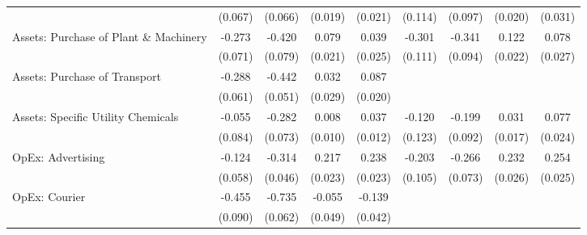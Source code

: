 {\begin{longtable}{l*{8}{c}}
                    &     (0.067)         &     (0.066)         &     (0.019)         &     (0.021)         &     (0.114)         &     (0.097)         &     (0.020)         &     (0.031)         \\
Assets: Purchase of Plant \& Machinery&      -0.273\sym{***}&      -0.420\sym{***}&       0.079\sym{***}&       0.039         &      -0.301\sym{**} &      -0.341\sym{***}&       0.122\sym{***}&       0.078\sym{**} \\
                    &     (0.071)         &     (0.079)         &     (0.021)         &     (0.025)         &     (0.111)         &     (0.094)         &     (0.022)         &     (0.027)         \\
Assets: Purchase of Transport&      -0.288\sym{***}&      -0.442\sym{***}&       0.032         &       0.087\sym{***}&                     &                     &                     &                     \\
                    &     (0.061)         &     (0.051)         &     (0.029)         &     (0.020)         &                     &                     &                     &                     \\
Assets: Specific Utility Chemicals&      -0.055         &      -0.282\sym{***}&       0.008         &       0.037\sym{**} &      -0.120         &      -0.199\sym{*}  &       0.031         &       0.077\sym{**} \\
                    &     (0.084)         &     (0.073)         &     (0.010)         &     (0.012)         &     (0.123)         &     (0.092)         &     (0.017)         &     (0.024)         \\
OpEx: Advertising   &      -0.124\sym{*}  &      -0.314\sym{***}&       0.217\sym{***}&       0.238\sym{***}&      -0.203         &      -0.266\sym{***}&       0.232\sym{***}&       0.254\sym{***}\\
                    &     (0.058)         &     (0.046)         &     (0.023)         &     (0.023)         &     (0.105)         &     (0.073)         &     (0.026)         &     (0.025)         \\
OpEx: Courier       &      -0.455\sym{***}&      -0.735\sym{***}&      -0.055         &      -0.139\sym{**} &                     &                     &                     &                     \\
                    &     (0.090)         &     (0.062)         &     (0.049)         &     (0.042)         &                     &                     &                     &                     \\

\end{longtable}}

